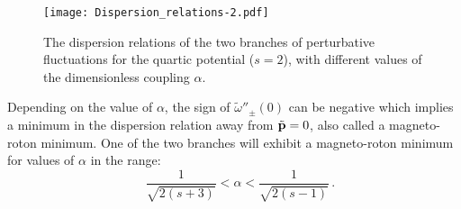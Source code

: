 \documentclass[12pt,a4paper]{article}
\def\be{\begin{equation}}
\def\ee{\end{equation}}
\begin{document}
\begin{figure}[h]
\begin{center}
    \texttt{[image: Dispersion\_relations-2.pdf]}    
    \caption{{\small The dispersion relations of the two branches of perturbative fluctuations for the quartic potential ($s=2$), with different values of the dimensionless coupling $\alpha$.}} \label{fig:dispersion}
    \end{center}
\end{figure}
Depending on the value of $\alpha$, the sign of  $\tilde\omega''_{\pm}(0)$ can be negative which implies a minimum in the dispersion relation away from $\tilde{\bf p}=0$, also called a magneto-roton minimum. One  of the two branches  will exhibit a magneto-roton minimum  for values of $\alpha$ in the range:
\be
\quad\frac{1}{\sqrt{2(s+3)}} < \alpha <  \frac{1}{\sqrt{2(s-1)}}\,.
\ee
\end{document}
